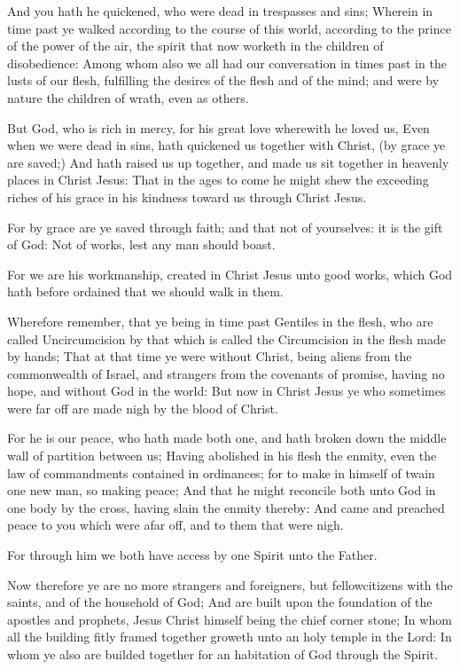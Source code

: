 \Chapter
\Verse And you hath he quickened, who were dead in trespasses and sins; \Verse Wherein in time past ye walked according to the course of this world, according to the prince of the power of the air, the spirit that now worketh in the children of disobedience: \Verse Among whom also we all had our conversation in times past in the lusts of our flesh, fulfilling the desires of the flesh and of the mind; and were by nature the children of wrath, even as others.

\Verse But God, who is rich in mercy, for his great love wherewith he loved us, \Verse Even when we were dead in sins, hath quickened us together with Christ, (by grace ye are saved;) \Verse And hath raised us up together, and made us sit together in heavenly places in Christ Jesus: \Verse That in the ages to come he might shew the exceeding riches of his grace in his kindness toward us through Christ Jesus.

\Verse For by grace are ye saved through faith; and that not of yourselves: it is the gift of God: \Verse Not of works, lest any man should boast.

\Verse For we are his workmanship, created in Christ Jesus unto good works, which God hath before ordained that we should walk in them.

\Verse Wherefore remember, that ye being in time past Gentiles in the flesh, who are called Uncircumcision by that which is called the Circumcision in the flesh made by hands; \Verse That at that time ye were without Christ, being aliens from the commonwealth of Israel, and strangers from the covenants of promise, having no hope, and without God in the world: \Verse But now in Christ Jesus ye who sometimes were far off are made nigh by the blood of Christ.

\Verse For he is our peace, who hath made both one, and hath broken down the middle wall of partition between us; \Verse Having abolished in his flesh the enmity, even the law of commandments contained in ordinances; for to make in himself of twain one new man, so making peace; \Verse And that he might reconcile both unto God in one body by the cross, having slain the enmity thereby: \Verse And came and preached peace to you which were afar off, and to them that were nigh.

\Verse For through him we both have access by one Spirit unto the Father.

\Verse Now therefore ye are no more strangers and foreigners, but fellowcitizens with the saints, and of the household of God; \Verse And are built upon the foundation of the apostles and prophets, Jesus Christ himself being the chief corner stone; \Verse In whom all the building fitly framed together groweth unto an holy temple in the Lord: \Verse In whom ye also are builded together for an habitation of God through the Spirit.


